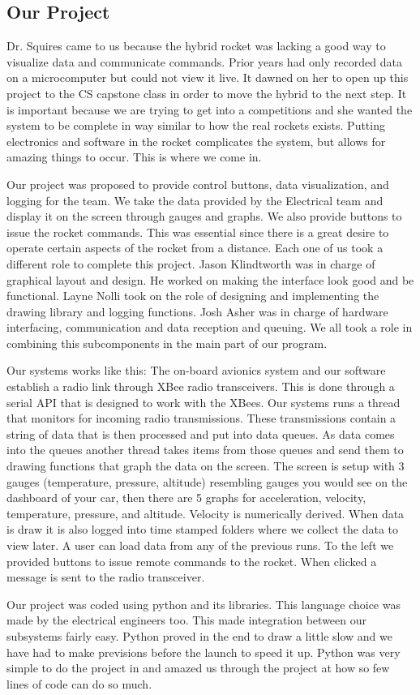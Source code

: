 \documentclass[10pt,draftclsnofoot,onecolumn,retainorgcmds]{IEEEtran}
\begin{document}
\subsection{Our Project}
Dr. Squires came to us because the hybrid rocket was lacking a good way to visualize data and communicate commands. Prior years had only recorded data on a microcomputer but could not view it live. It dawned on her to open up this project to the CS capstone class in order to move the hybrid to the next step. It is important because we are trying to get into a competitions and she wanted the system to be complete in way similar to how the real rockets exists. Putting electronics and software in the rocket complicates the system, but allows for amazing things to occur. This is where we come in. \par
Our project was proposed to provide control buttons, data visualization, and logging for the team. We take the data provided by the Electrical team and display it on the screen through gauges and graphs. We also provide buttons to issue the rocket commands. This was essential since there is a great desire to operate certain aspects of the rocket from a distance. Each one of us took a different role to complete this project. Jason Klindtworth was in charge of graphical layout and design. He worked on making the interface look good and be functional. Layne Nolli took on the role of designing and implementing the drawing library and logging functions. Josh Asher was in charge of hardware interfacing, communication and data reception and queuing. We all took a role in combining this subcomponents in the main part of our program. \par
Our systems works like this: The on-board avionics system and our software establish a radio link through XBee radio transceivers. This is done through a serial API that is designed to work with the XBees. Our systems runs a thread that monitors for incoming radio transmissions. These transmissions contain a string of data that is then processed and put into data queues. As data comes into the queues another thread takes items from those queues and send them to drawing functions that graph the data on the screen. The screen is setup with 3 gauges (temperature, pressure, altitude) resembling gauges you would see on the dashboard of your car, then there are 5 graphs for acceleration, velocity, temperature, pressure, and altitude. Velocity is numerically derived. When data is draw it is also logged into time stamped folders where we collect the data to view later. A user can load data from any of the previous runs. To the left we provided buttons to issue remote commands to the rocket. When clicked a message is sent to the radio transceiver. \par
Our project was coded using python and its libraries. This language choice was made by the electrical engineers too. This made integration between our subsystems fairly easy. Python proved in the end to draw a little slow and we have had to make previsions before the launch to speed it up. Python was very simple to do the project in and amazed us through the project at how so few lines of code can do so much. \par
\end{document}
